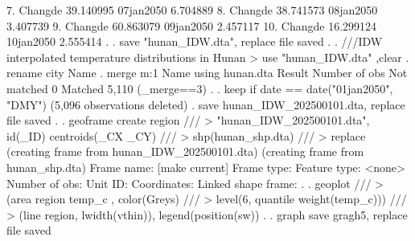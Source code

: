   7. {\VBAR} Changde   39.140995   07jan2050   6.704889 {\VBAR}
  8. {\VBAR} Changde   38.741573   08jan2050   3.407739 {\VBAR}
  9. {\VBAR} Changde   60.863079   09jan2050   2.457117 {\VBAR}
 10. {\VBAR} Changde   16.299124   10jan2050   2.555414 {\VBAR}
     {\BLC}
{\smallskip}
. 
. save "hunan_IDW.dta", replace
file{} saved
{\smallskip}
. 
. ///IDW interpolated temperature distributions in Hunan
> use "hunan_IDW.dta" ,clear
{\smallskip}
. rename city Name
{\smallskip}
. merge m:1 Name using hunan.dta
{\smallskip}
    Result                      Number of obs
    Not matched                             0
    Matched                             5,110  (_merge==3)
{\smallskip}
. 
. keep if date == date("01jan2050", "DMY")
(5,096 observations deleted)
{\smallskip}
. save hunan_IDW_202500101.dta, replace
file{} saved
{\smallskip}
. 
. geoframe create region ///
>     "hunan_IDW_202500101.dta", id(_ID) centroids(_CX _CY) ///
>     shp(hunan_shp.dta) ///
>     replace
(creating frame {} from hunan_IDW_202500101.dta)
(creating frame {} from hunan_shp.dta)
{\smallskip}
            Frame name: {} [make current]
            Frame type: {}
          Feature type: <none>
         Number of obs: {}
               Unit ID: {}
           Coordinates: {}
    Linked shape frame: {}
{\smallskip}
. 
. geoplot ///
>     (area region temp_c , color(Greys) ///
>                 level(6, quantile weight(temp_c))) ///
>     (line region, lwidth(vthin)), legend(position(sw))
{\smallskip}
. 
. graph save gragh5, replace
file {} saved
